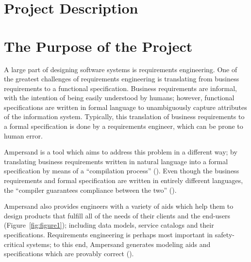 \documentclass[12pt]{report}
\begin{document}
{\section{Project Description}\label{sec:Intro}}
{\section{The Purpose of the Project}\label{sec:Purpose}}
A large part of designing software systems is requirements engineering. One
of the greatest challenges of requirements engineering is translating from
business requirements to a functional specification. Business requirements are
informal, with the intention of being easily understood by humans; however,
functional specifications are written in formal language to unambiguously capture attributes of the 
information system. Typically, this translation
of business requirements to a formal specification is done by a requirements
engineer, which can be prone to human error.

Ampersand is a tool which aims to address this problem in a different way; by
translating business requirements written in natural language into a formal
specification by means of a ``compilation process'' (\cite{derFun}). 
%
%
Even though the business requirements and formal specification are written in
entirely different languages, the ``compiler guarantees compliance between the
two'' (\cite[2]{derFun}). 

Ampersand also provides engineers with a variety of aids which
help them to design products that fulfill all of the needs of their clients and
the end-users (Figure~\ref{fig:figure1}); including data models, service catalogs and their
specifications. Requirements engineering is perhaps most important in
safety-critical systems; to this end, Ampersand generates modeling aids and
specifications which are provably correct (\cite{derFun}). 
\end{document}

